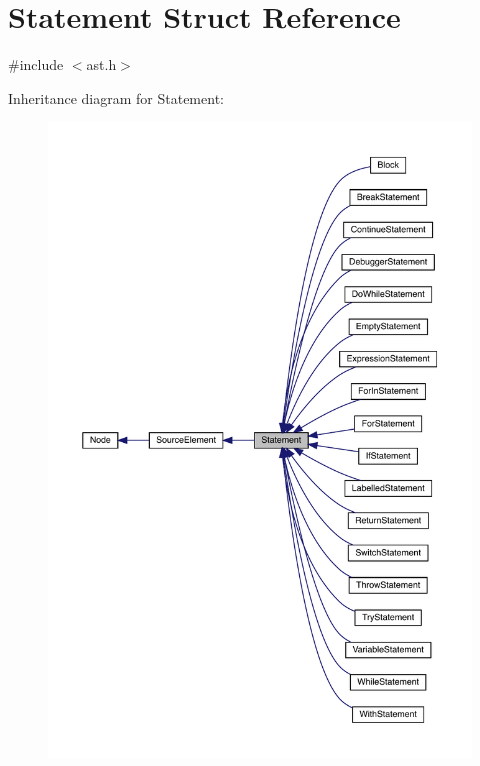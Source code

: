 \hypertarget{struct_statement}{}\section{Statement Struct Reference}
\label{struct_statement}


{\ttfamily \#include $<$ast.\+h$>$}



Inheritance diagram for Statement\+:\nopagebreak
\begin{figure}[H]
\begin{center}
\leavevmode
\includegraphics[width=350pt]{struct_statement__inherit__graph}
\end{center}
\end{figure}


